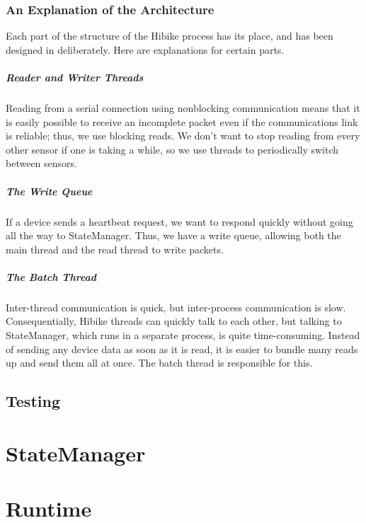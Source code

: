 \documentclass[12pt]{book}
\begin{document}
\subsection{An Explanation of the Architecture}
Each part of the structure of the Hibike process has its place, and has
been designed in deliberately. Here are explanations for certain parts.

\paragraph{Reader and Writer Threads}
Reading from a serial connection using nonblocking communication means that it
is easily possible to receive an incomplete packet even if the communications
link is reliable; thus, we use blocking reads. We don't want to stop reading
from every other sensor if one is taking a while, so we use threads to
periodically switch between sensors.

\paragraph{The Write Queue}
If a device sends a heartbeat request, we want to respond quickly
without going all the way to StateManager. Thus, we have a write queue, allowing
both the main thread and the read thread to write packets.

\paragraph{The Batch Thread}
Inter-thread communication is quick, but inter-process communication is slow.
Consequentially,
Hibike threads can quickly talk to each other, but talking to StateManager, which
runs in a separate process, is quite time-consuming. Instead of
sending any device data as soon as it is read, it is easier to bundle many
reads up and send them all at once. The batch thread is responsible for this.

\section{Testing}
\chapter{StateManager}
\chapter{Runtime}
\end{document}
